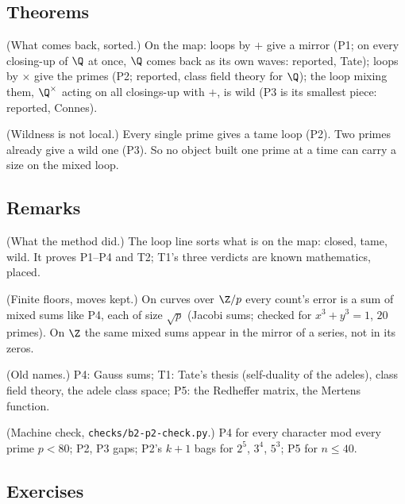 \subsection*{Theorems}

\begin{lines}
\item[\lab{T1}] (What comes back, sorted.) On the map: loops by $+$ give a mirror (P1; on every closing-up of $\Q$ at once, $\Q$ comes back as its own waves: reported, Tate); loops by $\times$ give the primes (P2; reported, class field theory for $\Q$); the loop mixing them, $\Q^\times$ acting on all closings-up with $+$, is wild (P3 is its smallest piece: reported, Connes).
\item[\lab{T2}] (Wildness is not local.) Every single prime gives a tame loop (P2). Two primes already give a wild one (P3). So no object built one prime at a time can carry a size on the mixed loop.
\end{lines}

\subsection*{Remarks}

\begin{lines}
\item[\lab{R1}] (What the method did.) The loop line sorts what is on the map: closed, tame, wild. It proves P1--P4 and T2; T1's three verdicts are known mathematics, placed.
\item[\lab{R2}] (Finite floors, moves kept.) On curves over $\Z/p$ every count's error is a sum of mixed sums like P4, each of size $\sqrt p$ (Jacobi sums; checked for $x^3 + y^3 = 1$, $20$ primes). On $\Z$ the same mixed sums appear in the mirror of a series, not in its zeros.
\item[\lab{R3}] (Old names.) P4: Gauss sums; T1: Tate's thesis (self-duality of the adeles), class field theory, the adele class space; P5: the Redheffer matrix, the Mertens function.
\item[\lab{R4}] (Machine check, \texttt{checks/b2-p2-check.py}.) P4 for every character mod every prime $p < 80$; P2, P3 gaps; P2's $k + 1$ bags for $2^5$, $3^4$, $5^3$; P5 for $n \le 40$.
\end{lines}

\subsection*{Exercises}

